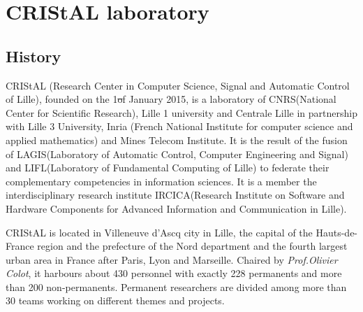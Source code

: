 \chapter{CRIStAL laboratory}

\section{History}

CRIStAL\footnotemark[1] \cite{cristal} (Research Center in Computer Science, Signal and Automatic Control of Lille), founded on the 1\st of January 2015, is a laboratory of CNRS\footnotemark[2] (National Center for Scientific Research), Lille 1 university and Centrale Lille in partnership with Lille 3 University, Inria (French National Institute for computer science and applied mathematics) and Mines Telecom Institute. It is the result of the fusion of LAGIS\footnotemark[4] (Laboratory of Automatic Control, Computer Engineering and Signal) and LIFL\footnotemark[4] (Laboratory of Fundamental Computing of Lille) to federate their complementary competencies in information sciences. It is a member the interdisciplinary research institute IRCICA\footnotemark[5] (Research Institute on Software and Hardware Components for Advanced Information and Communication in Lille). \\






CRIStAL is located in Villeneuve d'Ascq city in Lille, the capital of  the Hauts-de-France region and the prefecture of the Nord department and the fourth largest urban area in France after Paris, Lyon and Marseille. Chaired by \textit{Prof.Olivier Colot}, it harbours about 430 personnel with exactly 228 permanents and more than 200 non-permanents. Permanent researchers are divided among more than 30 teams working on different themes and projects.

